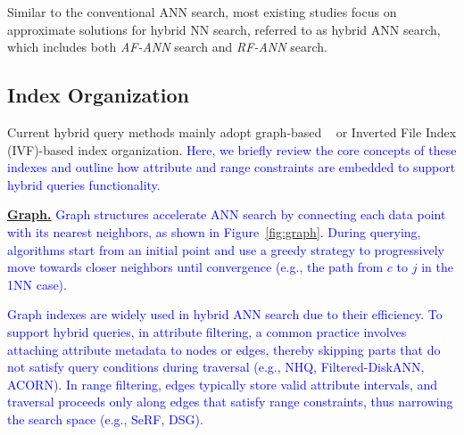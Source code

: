 \documentclass[sigconf, nonacm]{acmart}
\begin{document}
{	
	
	Similar to the conventional ANN search, most existing studies focus on approximate solutions for hybrid NN search, referred to as hybrid ANN search, which includes both \textit{AF-ANN} search and \textit{RF-ANN} search.
	
	
	
	\subsection{Index Organization}
	
	Current hybrid query methods mainly adopt graph-based ~\cite{nsw,kgraph,nsg,fanng,ngt} or Inverted File Index (IVF)-based \cite{PQ} index organization. 
	\textcolor{blue}{Here, we briefly review the core concepts of these indexes and outline how attribute and range constraints are embedded to support hybrid queries functionality.}
	
	\noindent\textbf{\underline{Graph.}}
	\textcolor{blue}{Graph structures accelerate ANN search by connecting each data point with its nearest neighbors, as shown in Figure~\ref{fig:graph}. During querying, algorithms start from an initial point and use a greedy strategy to progressively move towards closer neighbors until convergence (e.g., the path from $c$ to $j$ in the 1NN case).}
	
	\textcolor{blue}{Graph indexes are widely used in hybrid ANN search due to their efficiency. To support hybrid queries, in attribute filtering, a common practice involves attaching attribute metadata to nodes or edges, thereby skipping parts that do not satisfy query conditions during traversal (e.g., NHQ, Filtered-DiskANN, ACORN). In range filtering, edges typically store valid attribute intervals, and traversal proceeds only along edges that satisfy range constraints, thus narrowing the search space (e.g., SeRF, DSG).}
	
}
\end{document}
